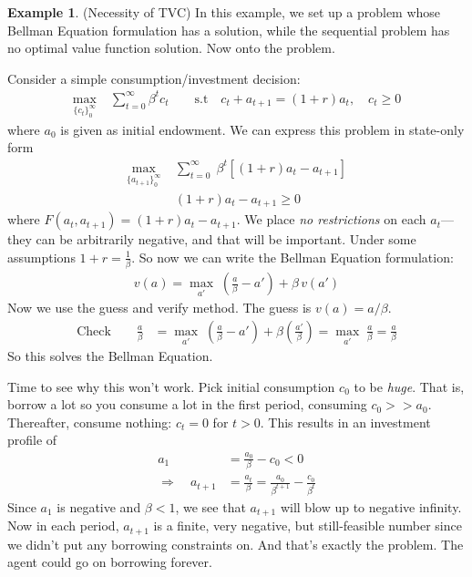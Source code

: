 \documentclass[12pt]{article}
\numberwithin{equation}{section} %
\theoremstyle{plain}
\theoremstyle{definition}
\newtheorem{ex}[thm]{Example}
\theoremstyle{remark}
\newcommand{\sumtinfz}{\sum^\infty_{t=0}}
\begin{document}
\clearpage
\begin{ex}{(Necessity of TVC)}
In this example, we set up a problem whose Bellman Equation formulation
has a solution, while the sequential problem has no optimal value
function solution. Now onto the problem.

Consider a simple consumption/investment decision:
\begin{align*}
  \max_{\{c_t\}_0^\infty} \; &\sumtinfz \beta^t c_t
  \qquad
  \text{s.t}\quad
  c_t + a_{t+1} = (1+r)a_t
  ,\quad
  c_t \geq 0
\end{align*}
where $a_0$ is given as initial endowment. We can express this problem
in state-only form
\begin{align*}
  \max_{\{a_{t+1}\}_0^\infty} \;
  &\sumtinfz \; \beta^t [(1+r)a_t - a_{t+1}] \\
  & (1+r)a_t - a_{t+1} \geq 0
\end{align*}
where $F(a_t,a_{t+1}) = (1+r)a_t - a_{t+1}$.
We place \emph{no restrictions} on each $a_t$---they can be arbitrarily
negative, and that will be important.
Under some assumptions $1+r = \frac{1}{\beta}$.
So now we can write the Bellman Equation formulation:
\begin{align*}
  v(a) = \max_{a'} \; \left(\frac{a}{\beta} - a'\right) + \beta \, v(a')
\end{align*}
Now we use the guess and verify method. The guess is $v(a) = a/\beta$.
\begin{align*}
  \text{Check} \qquad
  \frac{a}{\beta}
  &= \max_{a'} \;
  \left(\frac{a}{\beta} - a'\right)
  + \beta \left(\frac{a'}{\beta}\right)
  =
  \max_{a'} \;
  \frac{a}{\beta}
  =
  \frac{a}{\beta}
\end{align*}
So this solves the Bellman Equation.

Time to see why this won't work. Pick initial consumption $c_0$ to be
\emph{huge}. That is, borrow a lot so you consume a lot in the first
period, consuming $c_0 >> a_0$.
Thereafter, consume nothing: $c_t=0$ for $t>0$. This results in an
investment profile of
\begin{align*}
  a_{1} &= \frac{a_0}{\beta} - c_0 < 0 \\
  \Rightarrow \quad
  a_{t+1} &= \frac{a_t}{\beta}
  = \frac{a_0}{\beta^{t+1}} - \frac{c_0}{\beta^t}
\end{align*}
Since $a_1$ is negative and $\beta<1$, we see that $a_{t+1}$ will blow
up to negative infinity.
Now in each period, $a_{t+1}$ is a finite, very negative, but
still-feasible number since we didn't put any borrowing constraints on.
And that's exactly the problem. The agent could go on borrowing forever.


\end{ex}
\end{document}
